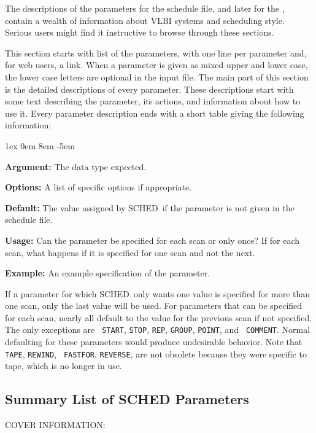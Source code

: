 \documentclass{report}
\newcommand{\schedb}{{\sc SCHED~}}
\newcommand{\rcwbox}[5]{
  \begin{list}{}{\parsep 1ex  \itemsep 0em
                 \leftmargin 8em  \itemindent -5em }
    \item {\bf Argument:} #1
    \item {\bf Options:}  #2
    \item {\bf Default:}  #3
    \item {\bf Usage:}    #4
    \item {\bf Example:}  #5
  \end{list}
}
\begin{document}
The descriptions of the parameters for the schedule file, and later
for the , contain a wealth of
information about VLBI systems and scheduling style.  Serious users
might find it instructive to browse through these sections.

This section starts with list of the parameters, with one line
per parameter and, for web users, a link.  When a parameter is
given as mixed upper and lower case, the lower case letters are
optional in the input file.  The main part of this section is
the detailed descriptions of every parameter.  These descriptions
start with some text describing the parameter, its actions, and
information about how to use it.  Every parameter description
ends with a short table giving the following information:

\rcwbox
{The data type expected.}
{A list of specific options if appropriate.}
{The value assigned by \schedb if the parameter is not given in the
schedule file.}
{Can the parameter be specified for each scan or only once? If for
each scan, what happens if it is specified for one scan and not the
next.}
{An example specification of the parameter.}

If a parameter for which \schedb only wants one value is specified for
more than one scan, only the last value will be used. For parameters
that can be specified for each scan, nearly all default to the value
for the previous scan if not specified.  The only exceptions are {\tt
START}, {\tt STOP}, {\tt REP}, {\tt GROUP}, {\tt POINT}, and {\tt
COMMENT}.  Normal defaulting for these parameters would produce
undesirable behavior.  Note that {\tt TAPE}, {\tt REWIND}, {\tt
FASTFOR}, {\tt REVERSE}, are not obsolete because they were specific
to tape, which is no longer in use.


\subsection{\label{SSEC:PARLST}Summary List of SCHED Parameters}

COVER INFORMATION:
\end{document}

